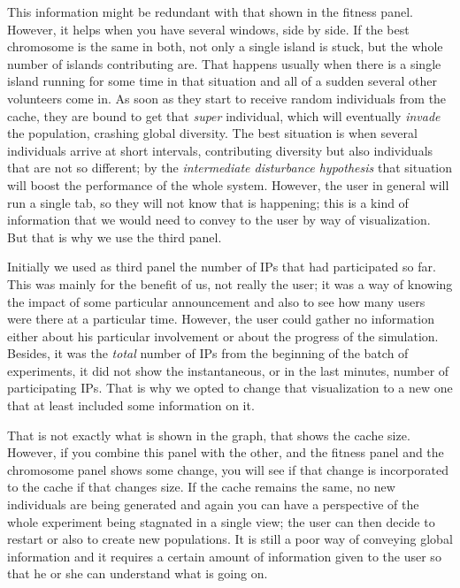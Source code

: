 \documentclass{sig-alternate}
\begin{document}
This information might be redundant with that shown in the fitness
panel. However, it helps when you
have several windows, side by side. If the best chromosome is the same
in both, not only a single island is stuck, but the whole number of
islands contributing are. That happens usually when there is a single
island running for some time in that situation and all of a sudden
several other volunteers come in. As soon as they start to receive
random individuals from the cache, they are bound to get that {\em
  super} individual, which will eventually {\em invade} the
population, crashing global diversity. The best situation is when
several individuals arrive at short intervals, contributing diversity
but also individuals that are not so different; by the {\em
  intermediate disturbance hypothesis} \cite{jj:2008:PPSN} that
situation will boost the performance of the whole system. However, the
user in general will run a single tab, so they will not know that is
happening; this is a kind of information that we would need to convey
to the user by way of visualization. But that is why we use the third
panel. 

Initially we used as third panel the number of IPs that had
participated so far. %
This was
mainly for the benefit of us, not really the user; it was a way of
knowing the impact of some particular announcement and also to see how
many users were there at a particular time. However, the user could
gather no information either about his particular involvement or about
the progress of the simulation. Besides, it was the {\em total} number
of IPs from the beginning of the batch of experiments, it did not show
the instantaneous, or in the last minutes, number of participating
IPs. That is why we opted to change that visualization to a new one
that at least included some information on it. 

That is not exactly what is shown in the graph, that
shows the cache size. However, if you combine this panel with the
other, and the fitness panel and the chromosome panel shows some
change, you will see if that change is incorporated to the cache if
that changes size. If the cache remains the same, no new individuals
are being generated and again you can have a perspective of the whole
experiment being stagnated in a single view; the user can then decide
to restart or also to create new populations. It is still a poor way
of conveying global information and it requires a certain amount of
information given to the user so that he or she can understand what is
going on.
\end{document}
